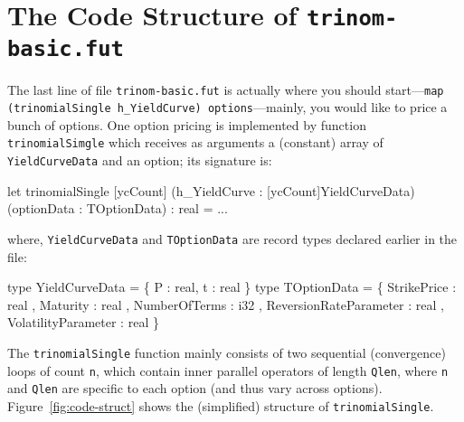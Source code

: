 \documentclass[a4paper,11pt]{article}
\begin{document}
\section{The Code Structure of {\tt trinom-basic.fut}}

The last line of file {\tt trinom-basic.fut} is actually where you should
start---{\tt map (trinomialSingle h\_YieldCurve) options}---mainly, you 
would like to price a bunch of options. One option pricing is implemented
by function {\tt trinomialSimgle} which receives as arguments a
(constant) array of {\tt YieldCurveData} and an option; its signature is:  
%
\begin{fancycode}
let trinomialSingle [ycCount] (h_YieldCurve : [ycCount]YieldCurveData)
                              (optionData   : TOptionData)
                            : real = ...
\end{fancycode}
\noindent where, {\tt YieldCurveData} and {\tt TOptionData} are record types
declared earlier in the file:
%
\begin{fancycode}
type YieldCurveData = \{ P : real, t : real \}
type TOptionData = \{
    StrikePrice   : real  
  , Maturity      : real  
  , NumberOfTerms : i32   
  , ReversionRateParameter : real 
  , VolatilityParameter    : real
\}
\end{fancycode}

The {\tt trinomialSingle} function mainly consists of two sequential 
(convergence) loops of count {\tt n}, which contain inner parallel
operators of length {\tt Qlen}, where {\tt n} and {\tt Qlen} are specific
to each option (and thus vary across options).   Figure~\ref{fig:code-struct} 
shows the (simplified) structure of {\tt trinomialSingle}.
\end{document}
